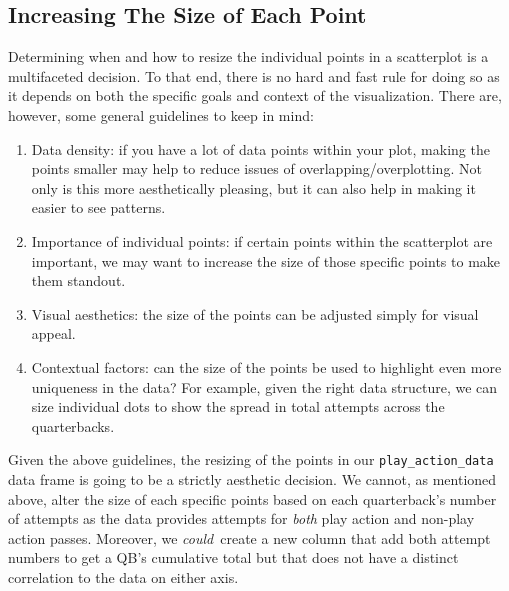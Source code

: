 \documentclass[
  letterpaper,
]{krantz}
\providecommand{\tightlist}{%
  \setlength{\itemsep}{0pt}\setlength{\parskip}{0pt}}\usepackage{longtable,booktabs,array}
\begin{document}
\hypertarget{increasing-the-size-of-each-point}{%
\subsection{Increasing The Size of Each
Point}\label{increasing-the-size-of-each-point}}

Determining when and how to resize the individual points in a
scatterplot is a multifaceted decision. To that end, there is no hard
and fast rule for doing so as it depends on both the specific goals and
context of the visualization. There are, however, some general
guidelines to keep in mind:

\begin{enumerate}
\def\labelenumi{\arabic{enumi}.}
\tightlist
\item
  Data density: if you have a lot of data points within your plot,
  making the points smaller may help to reduce issues of
  overlapping/overplotting. Not only is this more aesthetically
  pleasing, but it can also help in making it easier to see patterns.
\item
  Importance of individual points: if certain points within the
  scatterplot are important, we may want to increase the size of those
  specific points to make them standout.
\item
  Visual aesthetics: the size of the points can be adjusted simply for
  visual appeal.
\item
  Contextual factors: can the size of the points be used to highlight
  even more uniqueness in the data? For example, given the right data
  structure, we can size individual dots to show the spread in total
  attempts across the quarterbacks.
\end{enumerate}

Given the above guidelines, the resizing of the points in our
\texttt{play\_action\_data} data frame is going to be a strictly
aesthetic decision. We cannot, as mentioned above, alter the size of
each specific points based on each quarterback's number of attempts as
the data provides attempts for \emph{both} play action and non-play
action passes. Moreover, we \emph{could}~create a new column that add
both attempt numbers to get a QB's cumulative total but that does not
have a distinct correlation to the data on either axis.
\end{document}
